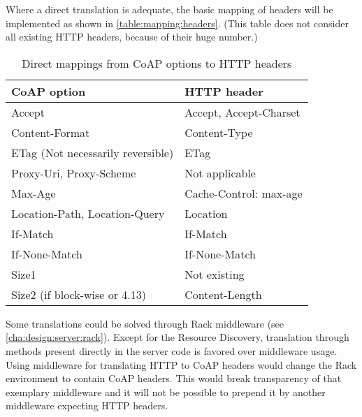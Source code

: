 	
	Where a direct translation is adequate, the basic mapping of headers will
	be implemented as shown in \autoref{table:mapping:headers}. (This table
	does not consider all existing HTTP headers, because of their huge number.)

	\begin{table}
		\begin{center}
			\begin{tabular}{l|l}
				\ac{CoAP} option								& \ac{HTTP} header \\
				\hline
				Accept											& Accept, Accept-Charset \\
				Content-Format									& Content-Type \\
				ETag \scriptsize{(Not necessarily reversible)}	& ETag \\
				Proxy-Uri, Proxy-Scheme							& \scriptsize{Not applicable} \\
				Max-Age											& Cache-Control: max-age \\
				Location-Path, Location-Query					& Location \\
				If-Match										& If-Match \\
				If-None-Match									& If-None-Match \\
				Size1											& \scriptsize{Not existing} \\
				Size2 \scriptsize{(if block-wise or 4.13)}		& Content-Length \\
			\end{tabular}
		\end{center}
		\caption{Direct mappings from \ac{CoAP} options to \ac{HTTP} headers}
		\label{table:mapping:headers}
	\end{table}


	Some translations could be solved through Rack middleware (see
	\autoref{cha:design:server:rack}). Except for the Resource Discovery,
	translation through methods present directly in the server code is favored
	over middleware usage. Using middleware for translating \ac{HTTP} to
	\ac{CoAP} headers would change the Rack environment to contain \ac{CoAP}
	headers. This would break transparency of that exemplary middleware and it
	will not be possible to prepend it by another middleware expecting
	\ac{HTTP} headers.


